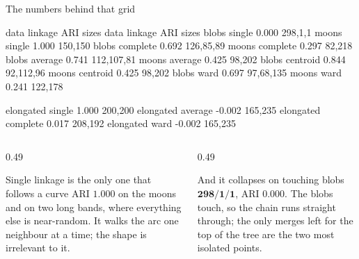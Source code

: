 \documentclass[aspectratio=169]{beamer}
\begin{document}
\begin{frame}[fragile,shrink=8]{The numbers behind that grid}
\begin{outblk}
data        linkage      ARI    sizes         data        linkage      ARI    sizes
blobs       single     0.000  298,1,1         moons       single     1.000  150,150
blobs       complete   0.692 126,85,89        moons       complete   0.297   82,218
blobs       average    0.741 112,107,81       moons       average    0.425   98,202
blobs       centroid   0.844  92,112,96       moons       centroid   0.425   98,202
blobs       ward       0.697  97,68,135       moons       ward       0.241  122,178

elongated   single     1.000  200,200         elongated   average   -0.002  165,235
elongated   complete   0.017  208,192         elongated   ward      -0.002  165,235
\end{outblk}
  \vspace{0.2em}
  \begin{columns}[T]
    \begin{column}{0.49\textwidth}
      \begin{exampleblock}{Single linkage is the only one that follows a curve}
        \small ARI $\mathbf{1.000}$ on the moons and on two long bands, where
        everything else is near-random. It walks the arc one neighbour at a
        time; the shape is irrelevant to it.
      \end{exampleblock}
    \end{column}
    \begin{column}{0.49\textwidth}
      \begin{alertblock}{And it collapses on touching blobs}
        \small $\mathbf{298/1/1}$, ARI $\mathbf{0.000}$. The blobs touch, so
        the chain runs straight through; the only merges left for the top of
        the tree are the two most isolated points.
      \end{alertblock}
    \end{column}
  \end{columns}
\end{frame}
\end{document}
